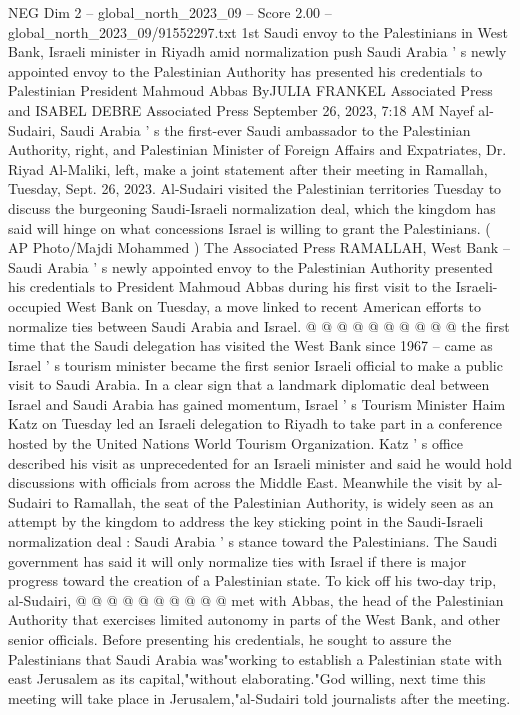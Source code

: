 \begin{textsample}{NEG Dim 2 – global\_north\_2023\_09 – Score 2.00 – global\_north\_2023\_09/91552297.txt}  \label{ex:f2_neg_071}
1st Saudi envoy to the Palestinians in West Bank, Israeli minister in Riyadh amid normalization push Saudi Arabia ' s newly appointed envoy to the Palestinian Authority has presented his credentials to Palestinian President Mahmoud Abbas ByJULIA FRANKEL Associated Press and ISABEL DEBRE Associated Press September 26, 2023, 7:18 AM Nayef al-Sudairi, Saudi Arabia ' s the first-ever Saudi ambassador to the Palestinian Authority, right, and Palestinian Minister of Foreign Affairs and Expatriates, Dr.
Riyad Al-Maliki, left, make a joint statement after their meeting in Ramallah, Tuesday, Sept. 26, 2023.
Al-Sudairi visited the Palestinian territories Tuesday to discuss the burgeoning Saudi-Israeli normalization deal, which the kingdom has said will hinge on what concessions Israel is willing to grant the Palestinians. ( AP Photo/Majdi Mohammed ) The Associated Press RAMALLAH, West Bank -- Saudi Arabia ' s newly appointed envoy to the Palestinian Authority presented his credentials to President Mahmoud Abbas during his first visit to the Israeli-occupied West Bank on Tuesday, a move linked to recent American efforts to normalize ties between Saudi Arabia and Israel. @ @ @ @ @ @ @ @ @ @ the first time that the Saudi delegation has visited the West Bank since 1967 -- came as Israel ' s tourism minister became the first senior Israeli official to make a public visit to Saudi Arabia.
In a clear sign that a landmark diplomatic deal between Israel and Saudi Arabia has gained momentum, Israel ' s Tourism Minister Haim Katz on Tuesday led an Israeli delegation to Riyadh to take part in a conference hosted by the United Nations World Tourism Organization.
Katz ' s office described his visit as unprecedented for an Israeli minister and said he would hold discussions with officials from across the Middle East.
Meanwhile the visit by al-Sudairi to Ramallah, the seat of the Palestinian Authority, is widely seen as an attempt by the kingdom to address the key sticking point in the Saudi-Israeli normalization deal : Saudi Arabia ' s stance toward the Palestinians.
The Saudi government has said it will only normalize ties with Israel if there is major progress toward the creation of a Palestinian state.
To kick off his two-day trip, al-Sudairi, @ @ @ @ @ @ @ @ @ @ met with Abbas, the head of the Palestinian Authority that exercises limited autonomy in parts of the West Bank, and other senior officials.
Before presenting his credentials, he sought to assure the Palestinians that Saudi Arabia was"working to establish a Palestinian state with east Jerusalem as its capital,"without elaborating."God willing, next time this meeting will take place in Jerusalem,"al-Sudairi told journalists after the meeting.

\end{textsample}
